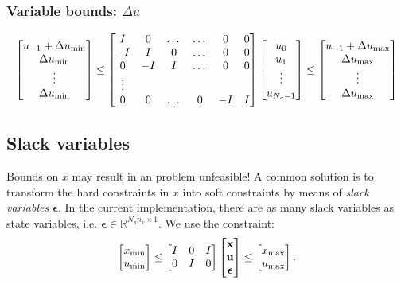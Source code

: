 \documentclass[a4paper,12pt,fleqn]{article}
\newcommand{\nx}{n_x}
\newcommand{\varepsvec}{\bm{\epsilon}}
\newcommand{\varxvec}{\mathbf{x}}
\newcommand{\varuvec}{\mathbf{u}}
\newcommand{\Np}{{N_p}}
\newcommand{\Nc}{{N_c}}
\begin{document}
\subsubsection{Variable bounds: $\Delta u$}
\begin{equation}
\begin{bmatrix}
u_{-1} +\Delta u_{\rm min}\\
\Delta u_{\rm min}\\
\vdots\\
\Delta u_{\rm min}\\
\end{bmatrix} \leq 
\begin{bmatrix}
  I  &  0 & \dots & \dots  & 0 & 0\\
 -I  &  I &  0    & \dots  & 0 & 0\\
  0  & -I &  I    & \dots  & 0 & 0\\
	\vdots\\
	0  &  0 & \dots & 0      &-I & I\\    
\end{bmatrix}
\begin{bmatrix}
u_0\\
u_1\\
\vdots\\
u_{\Nc-1}\\
\end{bmatrix}
\leq 
\begin{bmatrix}
u_{-1} +\Delta u_{\rm max}\\
\Delta u_{\rm max}\\
\vdots\\
\Delta u_{\rm max}\\
\end{bmatrix}
\end{equation}

\subsection{Slack variables}
Bounds on $x$ may result in an problem unfeasible! A common solution
is to transform the hard constraints in $x$ into soft constraints by means of  \emph{slack variables} $\varepsvec$. 
In the current implementation, there are as many slack variables as state variables, i.e. $\varepsvec \in \mathbb{R}^{\Np\nx \times 1}$.
We use the constraint:
\begin{equation}
\begin{bmatrix}
 x_{\rm min}\\u_{\rm min}
\end{bmatrix}
\leq
\begin{bmatrix}
 I &0 &I\\
 0 &I & 0
\end{bmatrix}
\begin{bmatrix}
 \varxvec\\
 \varuvec\\
 \varepsvec
\end{bmatrix}
\leq
\begin{bmatrix}
 x_{\rm max}\\u_{\rm max}
\end{bmatrix}.
\end{equation}
\end{document}
